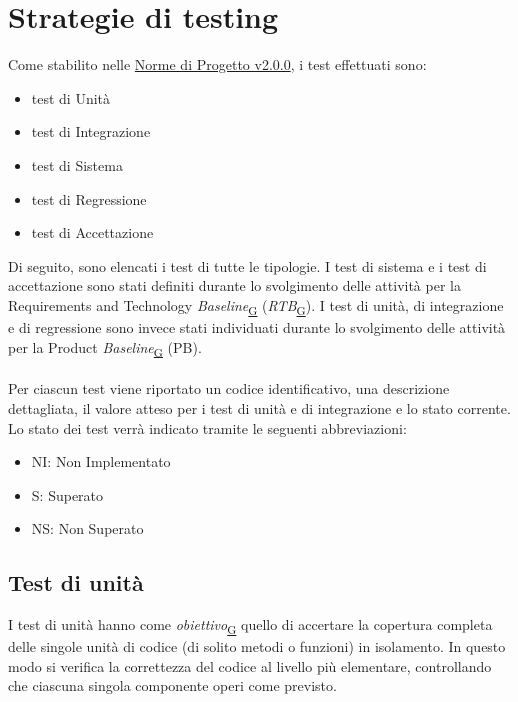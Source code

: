 \documentclass[a4paper,12pt]{article}
\begin{document}
\section{Strategie di testing}{

    Come stabilito nelle \href{https://atlasteam9.github.io/Atlas/docs/PB/documenti/interni/Norme%20di%20Progetto.pdf}{Norme di Progetto v2.0.0}, i test effettuati sono:
    \begin{itemize}
        \item test di Unità
        \item test di Integrazione
        \item test di Sistema
        \item test di Regressione
        \item test di Accettazione
    \end{itemize}

    \noindent Di seguito, sono elencati i test di tutte le tipologie. I test di sistema e i test di accettazione sono stati definiti durante lo svolgimento delle attività per la Requirements and Technology \textit{Baseline}\textsubscript{\href{https://atlasteam9.github.io/Atlas/glossario.html\#Baseline}{G}} (\textit{RTB}\textsubscript{\href{https://atlasteam9.github.io/Atlas/glossario.html\#RTB}{G}}). I test di unità, di integrazione e di regressione sono invece stati individuati durante lo svolgimento delle attività per la Product \textit{Baseline}\textsubscript{\href{https://atlasteam9.github.io/Atlas/glossario.html\#Baseline}{G}} (PB). \\\\
    Per ciascun test viene riportato un codice identificativo, una descrizione dettagliata, il valore atteso per i test di unità e di integrazione e lo stato corrente. Lo stato dei test verrà indicato tramite le seguenti abbreviazioni:
    \begin{itemize}
        \item NI: Non Implementato
        \item S: Superato
        \item NS: Non Superato
    \end{itemize}


    \subsection{Test di unità}{
        I test di unità hanno come \textit{obiettivo}\textsubscript{\href{https://atlasteam9.github.io/Atlas/glossario.html\#Obiettivo}{G}} quello di accertare la copertura completa delle singole unità di codice (di solito metodi o funzioni) in isolamento. In questo modo si verifica la correttezza del codice al livello più elementare, controllando che ciascuna singola componente operi come previsto.

}}
\end{document}

